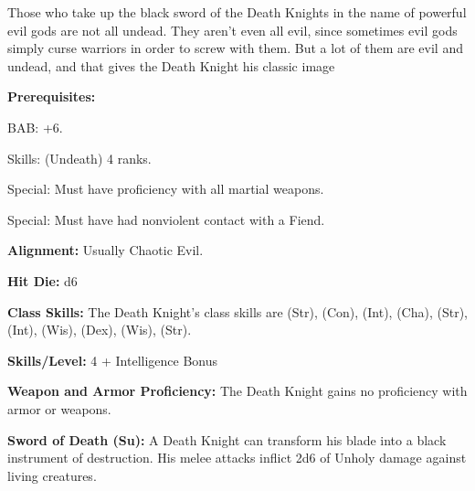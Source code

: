 
Those who take up the black sword of the Death Knights in the name of powerful evil gods are not all undead. They aren't even
all evil, since sometimes evil gods simply curse warriors in order to screw with them. But a lot of them are evil and undead, and that
gives the Death Knight his classic image

\textbf{Prerequisites:} 
\begin{description*}
\item[\hspace*{1.4cm}BAB:] +6.
\item[\hspace*{1.4cm}Skills:]  (Undeath) 4 ranks.
\item[\hspace*{1.4cm}Special:] Must have proficiency with all martial weapons.
\item[\hspace*{1.4cm}Special:] Must have had nonviolent contact with a Fiend.
\end{description*}

\textbf{Alignment:} Usually Chaotic Evil.

\textbf{Hit Die:} d6

\textbf{Class Skills:} The Death Knight's class skills are  (Str),  (Con),  (Int),  (Cha),  (Str),  (Int),  (Wis),  (Dex),  (Wis),  (Str).

\textbf{Skills/Level:} 4 + Intelligence Bonus

\goodbab{}
\poorfor{}
\poorref{}
\goodwil{}

\begin{classtable}
\end{classtable}

\classfeatures

\textbf{Weapon and Armor Proficiency:} The Death Knight gains no proficiency with armor or weapons.

\textbf{Sword of Death (Su):} A Death Knight can transform his blade into a black instrument of destruction. His melee attacks inflict 2d6 of Unholy damage against living creatures.

